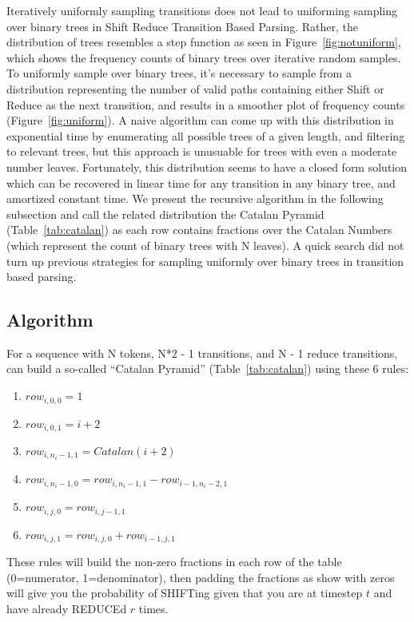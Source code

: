 \documentclass[11pt,a4paper]{article}
\begin{document}
Iteratively uniformly sampling transitions does not lead to uniforming sampling over binary trees in Shift Reduce Transition Based Parsing. Rather, the distribution of trees resembles a step function as seen in Figure~\ref{fig:notuniform}, which shows the frequency counts of binary trees over iterative random samples. To uniformly sample over binary trees, it's necessary to sample from a distribution representing the number of valid paths containing either Shift or Reduce as the next transition, and results in a smoother plot of frequency counts (Figure~\ref{fig:uniform}). A naive algorithm can come up with this distribution in exponential time by enumerating all possible trees of a given length, and filtering to relevant trees, but this approach is unusuable for trees with even a moderate number leaves. Fortunately, this distribution seems to have a closed form solution which can be recovered in linear time for any transition in any binary tree, and amortized constant time. We present the recursive algorithm in the following subsection and call the related distribution the Catalan Pyramid (Table~\ref{tab:catalan}) as each row contains fractions over the Catalan Numbers (which represent the count of binary trees with N leaves). A quick search did not turn up previous strategies for sampling uniformly over binary trees in transition based parsing.

\subsection{Algorithm}

For a sequence with N tokens, N*2 - 1 transitions, and N - 1 reduce transitions, can build a so-called ``Catalan Pyramid'' (Table~\ref{tab:catalan}) using these 6 rules:

\begin{enumerate}
\item
$row_{i,0,0} = 1$
\item
$row_{i,0,1} = i + 2$
\item
$row_{i,n_i-1,1} = Catalan(i + 2)$
\item
$row_{i,n_i-1,0} = row_{i,n_i-1,1} - row_{i-1,n_i-2,1}$
\item
$row_{i,j,0} = row_{i,j-1,1}$
\item
$row_{i,j,1} = row_{i,j,0} + row_{i-1,j,1}$
\end{enumerate}

These rules will build the non-zero fractions in each row of the table (0=numerator, 1=denominator), then padding the fractions as show with zeros will give you the probability of SHIFTing given that you are at timestep $t$ and have already REDUCEd $r$ times.
\end{document}
